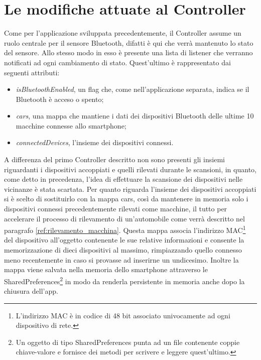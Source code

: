 \section{Le modifiche attuate al Controller}
Come per l'applicazione sviluppata precedentemente, il Controller assume un ruolo centrale per il sensore Bluetooth, difatti è qui che verrà mantenuto lo stato del sensore. Allo stesso modo in esso è presente una lista di listener che verranno notificati ad ogni cambiamento di stato. Quest'ultimo è rappresentato dai seguenti attributi:
\begin{itemize}
    \item \textit{isBluetoothEnabled}, un flag che, come nell'applicazione separata, indica se il Bluetooth è acceso o spento;
    \item \textit{cars}, una mappa che mantiene i dati dei dispositivi Bluetooth delle ultime 10 macchine connesse allo smartphone;
    \item \textit{connectedDevices}, l'insieme dei dispositivi connessi.
\end{itemize}
A differenza del primo Controller descritto non sono presenti gli insiemi riguardanti i dispositivi accoppiati e quelli rilevati durante le scansioni, in quanto, come detto in precedenza, l'idea di effettuare la scansione dei dispositivi nelle vicinanze è stata scartata. Per quanto riguarda l'insieme dei dispositivi accoppiati si è scelto di sostituirlo con la mappa cars, così da mantenere in memoria solo i dispositivi connessi precedentemente rilevati come macchine, il tutto per accelerare il processo di rilevamento di un'automobile come verrà descritto nel paragrafo \ref{ref:rilevamento_macchina}. Questa mappa associa l'indirizzo MAC\footnote{L'indirizzo MAC è in codice di 48 bit associato univocamente ad ogni dispositivo di rete.} del dispositivo all'oggetto contenente le sue relative informazioni e consente la memorizzazione di dieci dispositivi al massimo, rimpiazzando quello connesso meno recentemente in caso si provasse ad inserirne un undicesimo. Inoltre la mappa viene salvata nella memoria dello smartphone attraverso le SharedPreferences\footnote{Un oggetto di tipo SharedPreferences punta ad un file contenente coppie chiave-valore e fornisce dei metodi per scrivere e leggere quest'ultimo.} in modo da renderla persistente in memoria anche dopo la chiusura dell'app.

